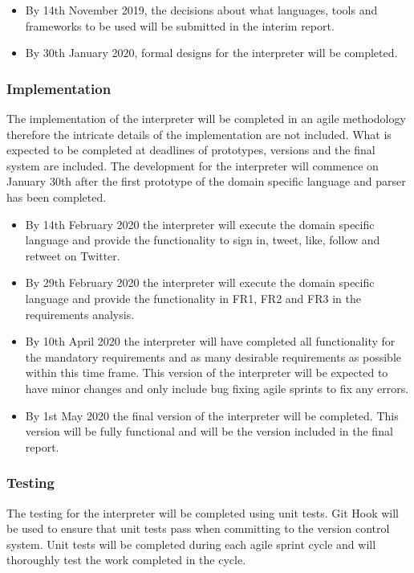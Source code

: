 \documentclass[chapterprefix=false]{scrreprt}
\begin{document}
\begin{itemize}
 \setlength\itemsep{-0.75em}
 \item By 14th November 2019, the decisions about what languages, tools and frameworks to be used will be submitted in the interim report.
 \item By 30th January 2020, formal designs for the interpreter will be completed.
\end{itemize}

\subsubsection{Implementation}

The implementation of the interpreter will be completed in an agile methodology therefore the intricate details of the implementation are not included. What is expected to be completed at deadlines of prototypes, versions and the final system are included. The development for the interpreter will commence on January 30th after the first prototype of the domain specific language and parser has been completed.

\begin{itemize}
 \setlength\itemsep{-0.75em}
 \item By 14th February 2020 the interpreter will execute the domain specific language and provide the functionality to sign in, tweet, like, follow and retweet on Twitter.
 \item By 29th February 2020 the interpreter will execute the domain specific language and provide the functionality in FR1, FR2 and FR3 in the requirements analysis.
 \item By 10th April 2020 the interpreter will have completed all functionality for the mandatory requirements and as many desirable requirements as possible within this time frame. This version of the interpreter will be expected to have minor changes and only include bug fixing agile sprints to fix any errors.
 \item By 1st May 2020 the final version of the interpreter will be completed. This version will be fully functional and will be the version included in the final report.
\end{itemize}

\subsubsection{Testing}

The testing for the interpreter will be completed using unit tests. Git Hook will be used to ensure that unit tests pass when committing to the version control system. Unit tests will be completed during each agile sprint cycle and will thoroughly test the work completed in the cycle.
\end{document}
